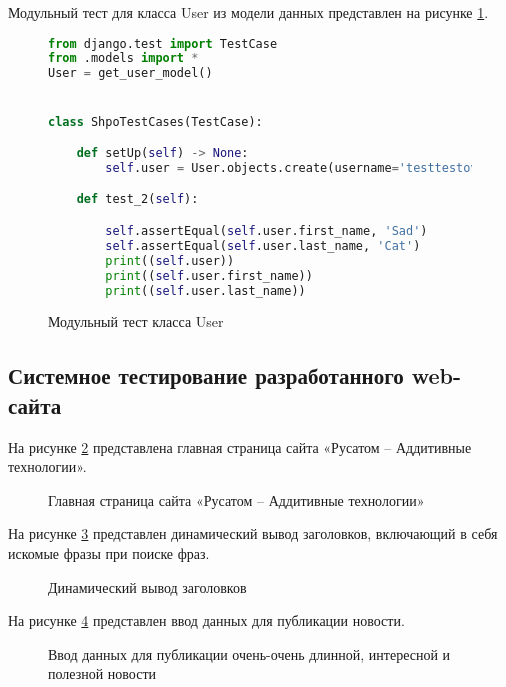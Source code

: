 Модульный тест для класса User из модели данных представлен на рисунке \ref{unitUser:image}.

\begin{figure}[ht]
\begin{lstlisting}[language=Python]
from django.test import TestCase
from .models import *
User = get_user_model()


class ShpoTestCases(TestCase):

    def setUp(self) -> None:
        self.user = User.objects.create(username='testtestovich', password='testtestovich', first_name='Sad', last_name='')

    def test_2(self):

        self.assertEqual(self.user.first_name, 'Sad')
        self.assertEqual(self.user.last_name, 'Cat')
        print((self.user))
        print((self.user.first_name))
        print((self.user.last_name))
\end{lstlisting}  
\caption{Модульный тест класса User}
\label{unitUser:image}
\end{figure}

\subsection{Системное тестирование разработанного web-сайта}

На рисунке \ref{main:image} представлена главная страница сайта «Русатом – Аддитивные технологии».
\newpage %
\begin{figure}[H] %
\caption{Главная страница сайта «Русатом – Аддитивные технологии»}
\label{main:image}
\end{figure}

На рисунке \ref{menu:image} представлен динамический вывод заголовков, включающий в себя искомые фразы при поиске фраз.

\begin{figure}[ht]
\caption{Динамический вывод заголовков}
\label{menu:image}
\end{figure}

На рисунке \ref{enter:image} представлен ввод данных для публикации новости.

\begin{figure}[ht]
\caption{Ввод данных для публикации очень-очень длинной, интересной и полезной новости}
\label{enter:image}
\end{figure}
